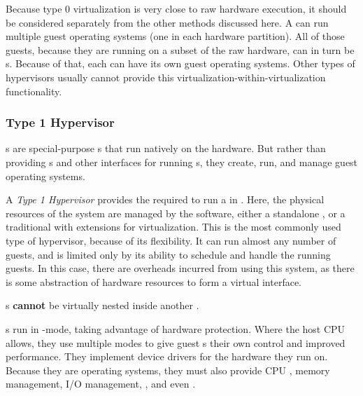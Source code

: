 Because type 0 virtualization is very close to raw hardware execution, it should be considered separately from the other  methods discussed here.
A  can run multiple guest operating systems (one in each hardware partition).
All of those guests, because they are running on a subset of the raw hardware, can in turn be s.
Because of that, each can have its own guest operating systems.
Other types of hypervisors usually cannot provide this virtualization-within-virtualization functionality.

\subsubsection{Type 1 Hypervisor}\label{subsubsec:Type1_Hypervisor}
s are special-purpose s that run natively on the hardware.
But rather than providing s and other interfaces for running s, they create, run, and manage guest operating systems.

\begin{definition}\label{def:Type1_Hypervisor}
  A \emph{Type 1 Hypervisor} provides the  required to run a  in .
  Here, the physical resources of the system are managed by the software, either a standalone , or a traditional  with extensions for virtualization.
  This is the most commonly used type of hypervisor, because of its flexibility.
  It can run almost any number of guests, and is limited only by its ability to schedule and handle the running guests.
  In this case, there are overheads incurred from using this system, as there is some abstraction of hardware resources to form a virtual interface.

  \begin{remark}
    s \textbf{cannot} be virtually nested inside another .
  \end{remark}
\end{definition}

s run in -mode, taking advantage of hardware protection.
Where the host CPU allows, they use multiple modes to give guest s their own control and improved performance.
They implement device drivers for the hardware they run on.
Because they are operating systems, they must also provide CPU , memory management, I/O management, , and even .

